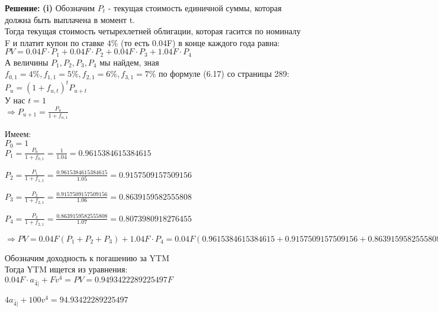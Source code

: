\documentclass{article}
\begin{document}
{ \bf \large Решение:}
{\bf \large  (i)} Обозначим $P_t$ - текущая стоимость единичной суммы, которая должна быть выплачена в момент t.\\
Тогда текущая стоимость  четырехлетней облигации, которая  гасится по номиналу F и платит купон по ставке $4\%$  (то есть 0.04F) в конце каждого года равна:\\

$PV= 0.04F \cdot P_1 + 0.04F \cdot P_2 + 0.04F \cdot P_3  + 1.04F \cdot P_4$\\

А величины $P_1,P_2,P_3,P_4$ мы найдем, зная $f_{0,1}=4\%,   f_{1,1}=5\%, f_{2,1}=6\%, f_{3,1}=7\%$ по формуле (6.17) со страницы 289:\\

$ \boxed{ P_u= (1+f_{u,t})^{t} P_{u+t} }$\\

У нас $ t=1$\\

$\Rightarrow P_{u+1} = \frac {P_u}{1+f_{u,1} }$

Имеем:\\

$P_{0} = 1$\\

$P_1 = \frac {P_0}{1+f_{0,1}} =   \frac { 1 }{1.04} = 0.9615384615384615$

$P_2 = \frac {P_1}{1+f_{1,1}} =   \frac { 0.9615384615384615 }{1.05} = 0.9157509157509156$

$P_3 = \frac {P_2}{1+f_{2,1}} =   \frac { 0.9157509157509156 }{1.06} = 0.8639159582555808$

$P_4 = \frac {P_3}{1+f_{2,1}} =   \frac { 0.8639159582555808 }{1.07} = 0.8073980918276455$

$\Rightarrow PV=0.04F(P_1+ P_2 +P_3) + 1.04F \cdot P_4 =
 0.04F(0.9615384615384615+0.9157509157509156+0.8639159582555808) +1.04F \cdot 0.8073980918276455=
 F(0.04\cdot 2.741205335544958 + 1.04 \cdot 0.8073980918276455) = 
 F(0.10964821342179831 + 0.8396940155007514) = 0.9493422289225497F$

Обозначим доходность к погашению за YTM\\

Тогда YTM ищется из уравнения:\\

$0.04F \cdot a_{\overset{-}4 |} + Fv^4 = PV=0.9493422289225497F$

$4a_{\overset{-}4 |} + 100v^4 = 94.93422289225497$\\
\end{document}
